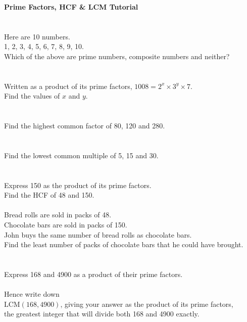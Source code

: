 \documentclass[12pt,a4paper]{article}
\begin{document}
\begin{center}
    \Large\bf Prime Factors, HCF \& LCM Tutorial
\end{center}
\section{}
Here are 10 numbers.\\
1, 2, 3, 4, 5, 6, 7, 8, 9, 10.\\
Which of the above are prime numbers, composite numbers and neither?

\section{}
Written as a product of its prime factors, \(1008=2^x\times3^y\times7\).\\
Find the values of \(x\) and \(y\).

\section{}
Find the highest common factor of 80, 120 and 280.

\section{}
Find the lowest common multiple of 5, 15 and 30.

\section{}
Express 150 as the product of its prime factors.\\
Find the HCF of 48 and 150.\\
\\
Bread rolls are sold in packs of 48.\\
Chocolate bars are sold in packs of 150.\\
John buys the same number of bread rolls as chocolate bars.\\
Find the least number of packs of chocolate bars that he could have brought.
\newpage
\section{}
Express 168 and 4900 as a product of their prime factors.\\
\\
Hence write down\\
\(\text{LCM}(168,4900)\), giving your answer as the product of its prime factors,\\
the greatest integer that will divide both 168 and 4900 exactly.
\end{document}
